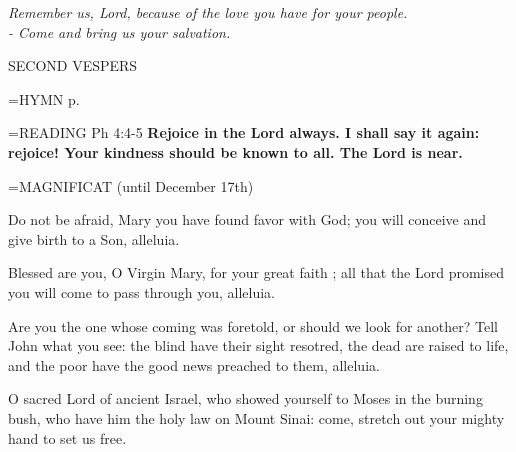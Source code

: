 \begin{center}
\textit{Remember us, Lord, because of the love you have for your people.\\
- Come and bring us your salvation.}
\end{center}

\begin{flushleft}\normalsize SECOND VESPERS\\\end{flushleft}

\hangindent=\parindent \small{\uppercase{HYMN} p.  \pageref{advent:firstHymn}\\}

\hangindent=\parindent \small{READING} Ph 4:4-5 \textbf{ Rejoice in the Lord always. I shall say it again: rejoice! Your kindness should be known to all. The Lord is near.\\}

\hangindent=\parindent \small MAGNIFICAT (until December 17th)
\begin{description}[labelindent=\parindent, noitemsep, leftmargin=*]
\item [Week 1:]  Do not be afraid, Mary you have found favor with God; you will conceive and give birth to a Son, alleluia.
\item [Week 2:]  Blessed are you, O Virgin Mary, for your great faith ; all that the Lord promised you will come to pass through you, alleluia.
\item [Week 3:]  Are you the one whose coming was foretold, or should we look for another? Tell John what you see: the blind have their sight resotred, the dead are raised to life, and the poor have the good news preached to them, alleluia.
\item [(December 18th):]  O sacred Lord of ancient Israel, who showed yourself to Moses in the burning bush, who have him the holy law on Mount Sinai: come, stretch out your mighty hand to set us free.
\end{description}
